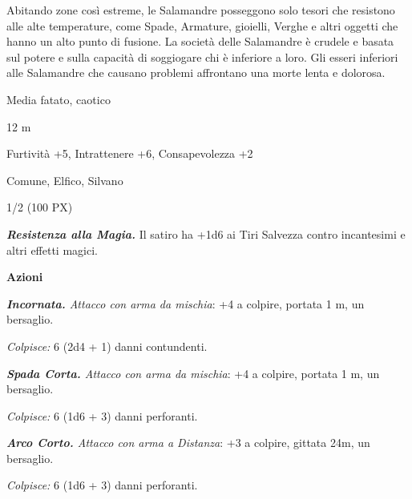 \begin{multicols}{2}
{Abitando zone così estreme, le Salamandre posseggono solo tesori che resistono alle alte temperature, come Spade, Armature, gioielli, Verghe e altri oggetti che hanno un alto punto di fusione. La società delle Salamandre è crudele e basata sul potere e sulla capacità di soggiogare chi è inferiore a loro. Gli esseri inferiori alle Salamandre che causano problemi affrontano una morte lenta e dolorosa.

\begin{description}[noitemsep, topsep=0pt, parsep=0pt, partopsep=0pt, itemsep=1pt, leftmargin=2.35cm,  labelwidth=2.2cm, itemindent=0cm, listparindent=0pt] %
\setlength{\baselineskip}{10pt}
\item[\textbf{Taglia/Tipo}] Media fatato, caotico
\item[\textbf{Caratt.}] 
\item[\textbf{Punti Ferita}] 
\item[\textbf{Movimento}] 12 m
\item[\textbf{Tiri Salvez.}] 
\item[\textbf{Comp.}] Furtività +5, Intrattenere +6, Consapevolezza +2
\item[\textbf{Linguaggi}] Comune, Elfico, Silvano
\item[\textbf{Sfida}] 1/2 (100 PX)
\end{description}
\smallskip

\emph{\textbf{Resistenza alla Magia.}} Il satiro ha +1d6 ai Tiri Salvezza contro incantesimi e altri effetti magici.

\textbf{Azioni}

\emph{\textbf{Incornata.} Attacco con arma da mischia}: +4 a colpire, portata 1 m, un bersaglio.

\emph{Colpisce:} 6 (2d4 + 1) danni contundenti.

\emph{\textbf{Spada Corta.} Attacco con arma da mischia}: +4 a colpire, portata 1 m, un bersaglio.

\emph{Colpisce:} 6 (1d6 + 3) danni perforanti.

\emph{\textbf{Arco Corto.} Attacco con arma a Distanza}: +3 a colpire, gittata 24m, un bersaglio.

\emph{Colpisce:} 6 (1d6 + 3) danni perforanti.

}
\end{multicols}

